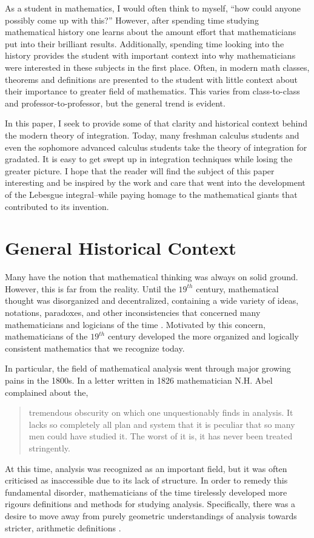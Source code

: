 \documentclass{article}
\theoremstyle{axiom} \newtheorem{axiom}{Axiom}
\theoremstyle{definition} \newtheorem{definition}{Definition}
\theoremstyle{example} \newtheorem{example}{Example}
\theoremstyle{proposition} \newtheorem{prop}{Proposition}
\theoremstyle{lemma} \newtheorem{lemma}{Lemma}
\begin{document}
As a student in mathematics, I would often think to myself, ``how could anyone
possibly come up with this?'' However, after spending time studying 
mathematical history one learns about the amount effort that 
mathematicians put into their brilliant results. Additionally, spending time looking into the
history provides the student with important context into why mathematicians were
interested in these subjects in the first place. Often, in modern math classes,
theorems and definitions are presented to the student with little context about
their importance to greater field of mathematics. This varies
from class-to-class and professor-to-professor, but the general trend is 
evident.

In this paper, I seek to provide some of that clarity and historical context 
behind the modern theory of integration. Today, many freshman calculus students 
and even the sophomore advanced calculus students take the theory of integration
for gradated. It is easy to get swept up in integration techniques while losing
the greater picture. I hope that the reader will find the subject of this paper 
interesting and be inspired by the work and care that went into the development 
of the Lebesgue integral--while paying homage to the mathematical giants that 
contributed to its invention.

\section{General Historical Context}

Many have the notion that mathematical thinking was always on solid ground. 
However, this is far from the reality. Until the 
$19^{th}$ century, mathematical thought was disorganized and decentralized,
containing a wide variety of ideas, notations, paradoxes, and other 
inconsistencies that concerned many mathematicians and logicians of the time
\cite{kline:1972}. Motivated by this concern, mathematicians of the $19^{th}$ 
century developed the more organized and logically consistent mathematics that 
we recognize today.

In particular, the field of mathematical analysis went through major growing 
pains in the 1800s. In a letter written in  1826 mathematician N.H. Abel 
complained about the,
\begin{quote}
	tremendous obscurity on which one unquestionably finds in analysis. It 
	lacks so completely all plan and system that it is peculiar that so many men 
	could have studied it. The worst of it is, it has never been treated stringently.
\end{quote}
At this time, analysis was recognized as an important field, but it was
often criticised as inaccessible due to its lack of structure. In order 
to remedy this fundamental disorder, mathematicians of the 
time tirelessly developed more rigours definitions and methods for studying
analysis. Specifically, there was a desire to move away from purely geometric 
understandings of analysis towards stricter, arithmetic definitions \cite{kline:1972}. 
\end{document}
